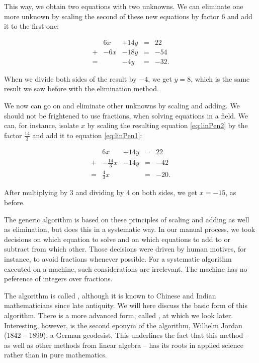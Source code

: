 \documentclass[tikz]{scrreprt}
\begin{document}
This way, we obtain two equations with two unknowns.
We can eliminate one more unknown by scaling the second
of these new equations by factor 6 and add it to the
first one:

\begin{equation}
\begin{array}{crrcr}
  &  6x & + 14y  & = &  22\\
+ & -6x & - 18y  & = & -54\\
= &     & -4y  & = & -32.
\end{array}
\end{equation}

When we divide both sides of the result by $-4$,
we get $y = 8$, which is the same result we saw
before with the elimination method.

We now can go on and eliminate other unknowns
by scaling and adding. We should not be frightened
to use fractions, when solving equations in a field.
We can, for instance, isolate $x$ by scaling
the resulting equation \ref{eq:linPen2} by the factor
$\frac{14}{3}$ and add it to equation \ref{eq:linPen1}:

\begin{equation}
\begin{array}{crrcr}
  &             6x & + 14y  & = &  22\\
+ & -\frac{14}{3}x & - 14y  & = & -42\\
= &  \frac{4}{3}x  &        & = & -20.
\end{array}
\end{equation}

After multiplying by $3$ and dividing by 4 on both sides,
we get $x = -15$, as before.

The generic algorithm is based on
these principles of scaling and adding as well as elimination,
but does this in a systematic way. In our manual process,
we took decisions on which equation to solve and on which
equations to add to or subtract from which other. 
Those decisions 
were driven by human motives, for instance, to avoid
fractions whenever possible. For a systematic algorithm
executed on a machine, such considerations are irrelevant.
The machine has no peference of integers over fractions.

The algorithm is called ,
although it is known to Chinese and Indian mathematicians
since late antiquity. We will here discuss the basic form
of this algorithm. There is a more advanced form,
called , at which we look later.
Interesting, however, is the second eponym of the algorithm,
Wilhelm Jordan (1842 -- 1899), a German geodesist.
This underlines the fact that this method -- as well as other
methods from linear algebra -- has its roots
in applied science rather than in pure mathematics.
\end{document}
